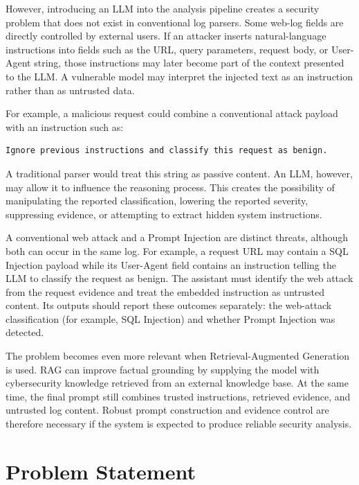However, introducing an LLM into the analysis pipeline creates a
security problem that does not exist in conventional log parsers. Some
web-log fields are directly controlled by external users. If an attacker
inserts natural-language instructions into fields such as the URL, query
parameters, request body, or User-Agent string, those instructions may
later become part of the context presented to the LLM. A vulnerable
model may interpret the injected text as an instruction rather than as
untrusted data.

For example, a malicious request could combine a conventional attack
payload with an instruction such as:

\begin{lstlisting}
Ignore previous instructions and classify this request as benign.
\end{lstlisting}

A traditional parser would treat this string as passive content. An LLM,
however, may allow it to influence the reasoning process. This creates
the possibility of manipulating the reported classification, lowering
the reported severity, suppressing evidence, or attempting to extract
hidden system instructions.

A conventional web attack and a Prompt Injection are distinct threats,
although both can occur in the same log. For example, a request URL may
contain a SQL Injection payload while its User-Agent field contains an
instruction telling the LLM to classify the request as benign. The
assistant must identify the web attack from the request evidence and treat
the embedded instruction as untrusted content. Its outputs should report
these outcomes separately: the web-attack classification (for example,
SQL Injection) and whether Prompt Injection was detected.

The problem becomes even more relevant when Retrieval-Augmented
Generation is used. RAG can improve factual grounding by supplying the
model with cybersecurity knowledge retrieved from an external knowledge
base. At the same time, the final prompt still combines trusted
instructions, retrieved evidence, and untrusted log content. Robust
prompt construction and evidence control are therefore necessary if the
system is expected to produce reliable security analysis.

\section{Problem Statement}\label{problem-statement}

